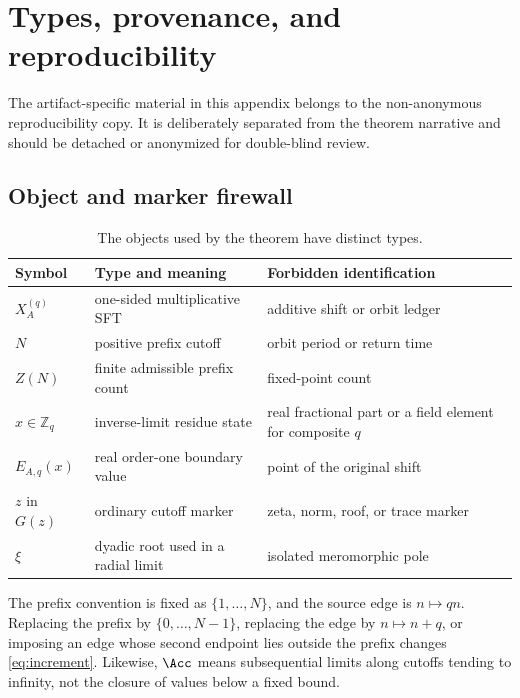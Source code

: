 \section{Types, provenance, and reproducibility}
\label{app:types}

The artifact-specific material in this appendix belongs to the
non-anonymous reproducibility copy.  It is deliberately separated from the
theorem narrative and should be detached or anonymized for double-blind
review.

\subsection{Object and marker firewall}

\begin{table}[htbp]
\centering
\caption{The objects used by the theorem have distinct types.}
\label{tab:types}
\small
\begin{tabularx}{\textwidth}{>{\raggedright\arraybackslash}p{2.7cm}
                            >{\raggedright\arraybackslash}p{4.6cm}
                            >{\raggedright\arraybackslash}X}
\toprule
Symbol & Type and meaning & Forbidden identification \\
\midrule
\(X_A^{(q)}\) & one-sided multiplicative SFT & additive shift or orbit ledger \\
\(N\) & positive prefix cutoff & orbit period or return time \\
\(Z(N)\) & finite admissible prefix count & fixed-point count \\
\(x\in\mathbb Z_q\) & inverse-limit residue state & real fractional part or a field element for composite \(q\) \\
\(E_{A,q}(x)\) & real order-one boundary value & point of the original shift \\
\(z\) in \(G(z)\) & ordinary cutoff marker & zeta, norm, roof, or trace marker \\
\(\xi\) & dyadic root used in a radial limit & isolated meromorphic pole \\
\bottomrule
\end{tabularx}
\end{table}

The prefix convention is fixed as \(\{1,\ldots,N\}\), and the source edge is
\(n\mapsto qn\).  Replacing the prefix by \(\{0,\ldots,N-1\}\), replacing
the edge by \(n\mapsto n+q\), or imposing an edge whose second endpoint lies
outside the prefix changes \eqref{eq:increment}.  Likewise,
\(\Acc\) means subsequential limits along cutoffs tending to infinity, not
the closure of values below a fixed bound.

